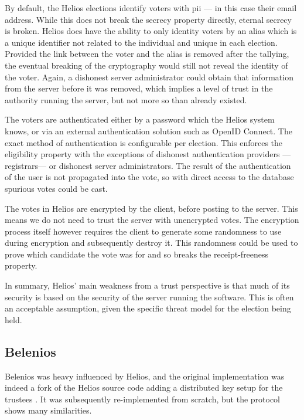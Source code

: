 By default, the Helios elections identify voters with \gls{pii} --- in this case their email address. While this does not break the secrecy property directly, eternal secrecy is broken. Helios does have the ability to only identity voters by an alias which is a unique identifier not related to the individual and unique in each election. Provided the link between the voter and the alias is removed after the tallying, the eventual breaking of the cryptography would still not reveal the identity of the voter. Again, a dishonest server administrator could obtain that information from the server before it was removed, which implies a level of trust in the authority running the server, but not more so than already existed.

The voters are authenticated either by a password which the Helios system knows, or via an external authentication solution such as OpenID Connect. The exact method of authentication is configurable per election. This enforces the eligibility property with the exceptions of dishonest authentication providers ---registrars--- or dishonest server administrators. The result of the authentication of the user is not propagated into the vote, so with direct access to the database spurious votes could be cast.

The votes in Helios are encrypted by the client, before posting to the server. This means we do not need to trust the server with unencrypted votes. The encryption process itself however requires the client to generate some randomness to use during encryption and subsequently destroy it. This randomness could be used to prove which candidate the vote was for and so breaks the receipt-freeness property.

In summary, Helios' main weakness from a trust perspective is that much of its security is based on the security of the server running the software. This is often an acceptable assumption, given the specific threat model for the election being held.

\subsection{Belenios}

Belenios was heavy influenced by Helios, and the original implementation was indeed a fork of the Helios source code adding a distributed key setup for the trustees \cite{cortierBeleniosSimplePrivate2019}. It was subsequently re-implemented from scratch, but the protocol shows many similarities.

